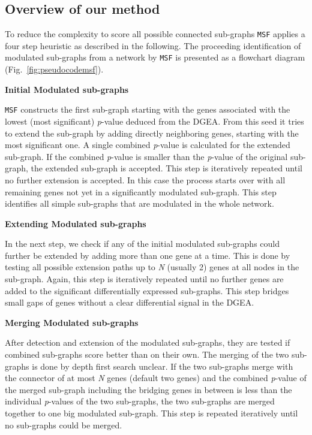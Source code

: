 \documentclass[10pt,a4paper,twocolumn]{article}
\newcommand{\ILH}[1]{\begingroup\color{blue}#1\endgroup}
\begin{document}
\subsection*{Overview of our method}

To reduce the complexity to score all possible connected sub-graphs
\texttt{MSF} applies a four step heuristic as described in the
following. The proceeding identification of modulated sub-graphs from a
network by \texttt{MSF} is presented as a flowchart diagram
(Fig.~\ref{fig:pseudocodemsf}).



\textbf{Initial Modulated sub-graphs}

\texttt{MSF} constructs the first sub-graph starting with the genes
associated with the lowest (most significant) \textit{p}-value deduced from
the DGEA. From this seed it tries to extend the sub-graph by adding directly
neighboring genes, starting with the most significant one. A single
combined \textit{p}-value is calculated for the extended sub-graph.
If the combined \textit{p}-value is smaller than the \textit{p}-value of
the original sub-graph,
the extended sub-graph is accepted. This step is
iteratively repeated until no further extension is accepted. In this case
the process starts over with all remaining genes not yet in a significantly
modulated sub-graph. This step identifies all simple sub-graphs that
are modulated in the whole network.\newline

\textbf{Extending Modulated sub-graphs}

In the next step, we check if any of the initial modulated sub-graphs 
could further be extended by adding more than one gene at a time. This is done
by testing all possible extension paths up to \emph{N} (usually 2) genes at
all nodes in the sub-graph. Again, this step is iteratively repeated until
no further genes are added to the significant differentially expressed
sub-graphs. This step bridges small gaps of genes without a clear
differential signal in the DGEA.\newline

\textbf{Merging Modulated sub-graphs}

After detection and extension of the modulated sub-graphs, they are tested
if combined sub-graphs score better than on their own. The merging of the
two sub-graphs is done by depth first search \ILH{unclear}. If the two sub-graphs merge
with the connector of at most \emph{N} genes (default two genes) and the
combined \textit{p}-value of the merged sub-graph including the bridging
genes in between is less than the individual \textit{p}-values of the two
sub-graphs, the two sub-graphs are merged together to one big modulated
sub-graph. This step is repeated iteratively until no sub-graphs could be
merged.\newline
\end{document}
